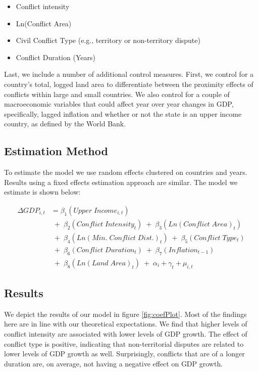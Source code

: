 \begin{itemize}
	\item Conflict intensity
	\item Ln(Conflict Area)
	\item Civil Conflict Type (e.g., territory or non-territory dispute)
	\item Conflict Duration (Years)
\end{itemize}

Last, we include a number of additional control measures. First, we control for a country's total, logged land area to differentiate between the proximity effects of conflicts within large and small countries. We also control for a couple of macroeconomic variables that could affect year over year changes in GDP, specifically, lagged inflation and whether or not the state is an upper income country, as defined by the World Bank.

\subsection{Estimation Method}

To estimate the model we use random effects clustered on countries and years. Results using a fixed effects estimation approach are similar. The model we estimate is shown below:

\begin{align*}
	\Delta GDP_{i,t} &= \beta_{1}(Upper \; Income_{i,t}) \\
	& \;+\; \beta_{2}(Conflict \; Intensity_{t}) \;+\; \beta_{3}(Ln(Conflict \; Area)_{t}) \\
	& \;+\; \beta_{4}(Ln(Min. \; Conflict \; Dist.)_{t}) \;+\; \beta_{5}(Conflict \; Type_{t}) \\
	& \;+\; \beta_{6}(Conflict \; Duration_{t}) \;+\; \beta_{7}(Inflation_{t-1}) \\
	& \;+\; \beta_{8}(Ln(Land \; Area)_{t}) \;+\; \alpha_{i} + \gamma_{t} + \mu_{i,t}
\end{align*}

\subsection{Results} 

We depict the results of our model in figure \ref{fig:coefPlot}. Most of the findings here are in line with our theoretical expectations. We find that higher levels of conflict intensity are associated with lower levels of GDP growth. The effect of conflict type is positive, indicating that non-territorial disputes are related to lower levels of GDP growth as well. Surprisingly, conflicts that are of a longer duration are, on average, not having a negative effect on GDP growth. 

